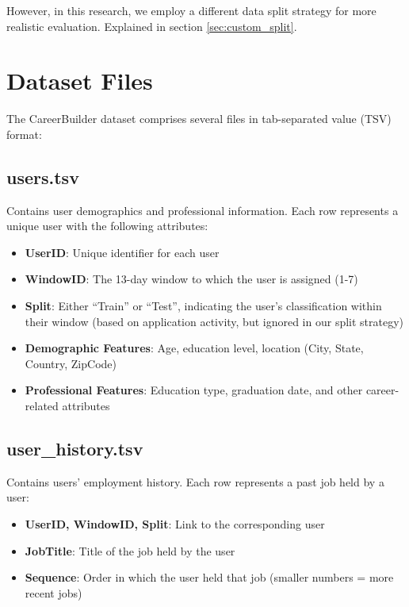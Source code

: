 However, in this research, we employ a different data split strategy for more realistic evaluation. Explained in section \ref{sec:custom_split}.

\section{Dataset Files}
\label{sec:dataset_files}

The CareerBuilder dataset comprises several files in tab-separated value (TSV) format:

\subsection{users.tsv}

Contains user demographics and professional information. Each row represents a unique user with the following attributes:
\begin{itemize}
    \item \textbf{UserID}: Unique identifier for each user
    \item \textbf{WindowID}: The 13-day window to which the user is assigned (1-7)
    \item \textbf{Split}: Either ``Train'' or ``Test'', indicating the user's classification within their window (based on application activity, but ignored in our split strategy)
    \item \textbf{Demographic Features}: Age, education level, location (City, State, Country, ZipCode)
    \item \textbf{Professional Features}: Education type, graduation date, and other career-related attributes
\end{itemize}

\subsection{user\_history.tsv}

Contains users' employment history. Each row represents a past job held by a user:
\begin{itemize}
    \item \textbf{UserID, WindowID, Split}: Link to the corresponding user
    \item \textbf{JobTitle}: Title of the job held by the user
    \item \textbf{Sequence}: Order in which the user held that job (smaller numbers = more recent jobs)
\end{itemize}

